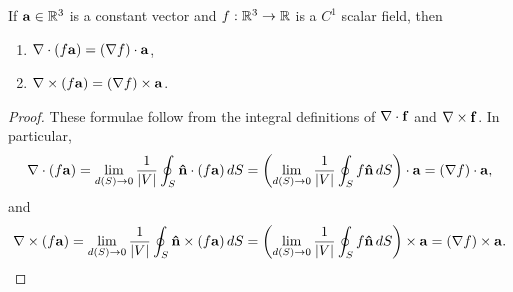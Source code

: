\documentclass[10pt, a4paper]{article}
\begin{document}
\begin{lemma}\label{pre:mathmethII:lem:gradscfldprods}
    If $\mathbf{a} \in \mathbb{R} ^ 3$ is a constant vector and $f : \mathbb{R} ^ 3 \to \mathbb{R}$ is a $C ^ {1}$ scalar field,
    then
    \begin{enumerate}[label = (\roman*)]
        \item $\mathbf{\nabla} \cdot (f\mathbf{a}) = (\mathbf{\nabla} f)\cdot \mathbf{a}$,
        
        \item $\mathbf{\nabla} \times (f\mathbf{a}) = (\mathbf{\nabla} f)\times \mathbf{a}$.
    \end{enumerate}

    \begin{proof}
        These formulae follow from the integral definitions of $\mathbf{\nabla} \cdot \mathbf{f}$ and $\mathbf{\nabla} \times \mathbf{f}$.
        In particular,
        \[
        \mathbf{\nabla} \cdot (f\mathbf{a}) = \lim_{d(S) \to 0}\frac{1}{|V|}\oint_{S}\mathbf{\hat{n}}\cdot(f\mathbf{a})\,dS = \left(\lim_{d(S) \to 0}\frac{1}{|V|}\oint_{S}f\mathbf{\hat{n}}\,dS\right) \cdot \mathbf{a} = (\mathbf{\nabla} f)\cdot\mathbf{a},
        \]
        and
        \[
        \mathbf{\nabla} \times (f\mathbf{a}) = \lim_{d(S) \to 0}\frac{1}{|V|}\oint_{S}\mathbf{\hat{n}}\times(f\mathbf{a})\,dS = \left(\lim_{d(S) \to 0}\frac{1}{|V|}\oint_{S}f\mathbf{\hat{n}}\,dS\right) \times \mathbf{a} = (\mathbf{\nabla} f)\times\mathbf{a}.
        \]
    \end{proof}
\end{lemma}
\end{document}
